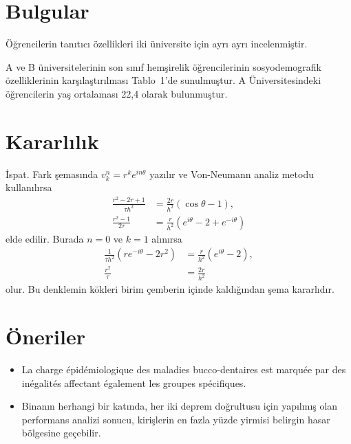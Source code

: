 \documentclass[10pt,a4paper,twocolumn]{article}
\begin{document}
\section{Bulgular}
Öğrencilerin tanıtıcı özellikleri iki üniversite için ayrı ayrı incelenmiştir.

A ve B üniversitelerinin son sınıf hemşirelik öğrencilerinin sosyodemografik özelliklerinin karşılaştırılması Tablo~1'de\newpage\noindent
sunulmuştur. A Üniversitesindeki öğrencilerin yaş ortalaması 22,4 olarak bulunmuştur.

\section{Kararlılık}
İspat. Fark şemasında $v_k^n = r^k e^{in\theta}$ yazılır ve Von-Neumann analiz metodu kullanılırsa
\begin{align}
\frac{r^2-2r+1}{\tau h^2} &= \frac{2r}{h^2}\left(\cos\theta - 1\right),\\
\frac{r^2-1}{2\tau} &= \frac{r}{h^2}\left(e^{i\theta} - 2 + e^{-i\theta}\right)
\end{align}
elde edilir. Burada $n=0$ ve $k=1$ alınırsa
\begin{align}
\frac{1}{\tau h^2}\left(r e^{-i\theta} - 2r^2\right) &= \frac{r}{h^2}\left(e^{i\theta} - 2\right),\\
\frac{r^2}{\tau} &= \frac{2r}{h^2}
\end{align}
olur. Bu denklemin kökleri birim çemberin içinde kaldığından şema kararlıdır.

\section{Öneriler}
\begin{itemize}
\item La charge épidémiologique des maladies bucco-dentaires est marquée par des inégalités affectant également les groupes spécifiques.
\item Binanın herhangi bir katında, her iki deprem doğrultusu için yapılmış olan performans analizi sonucu, kirişlerin en fazla yüzde yirmisi belirgin hasar bölgesine geçebilir.
\end{itemize}
\paragrafC
\end{document}
